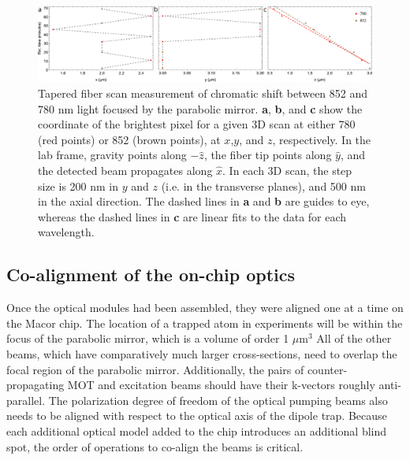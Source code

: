 \begin{figure}
    \centering
    \includegraphics[width=\textwidth]{Images/fiberscan_852_780_xyz_fig.pdf}
    \caption{Tapered fiber scan measurement of chromatic shift between 852 and 780 nm light focused by the parabolic mirror. \textbf{a}, \textbf{b}, and \textbf{c} show the coordinate of the brightest pixel for a given 3D scan at either 780 (red points) or 852 (brown points), at $x$,$y$, and $z$, respectively. In the lab frame, gravity points along $-\hat{z}$, the fiber tip points along $\hat{y}$, and the detected beam propagates along $\hat{x}$. In each 3D scan, the step size is 200 nm in $y$ and $z$ (i.e. in the transverse planes), and 500 nm in the axial direction. The dashed lines in \textbf{a} and \textbf{b} are guides to eye, whereas the dashed lines in \textbf{c} are linear fits to the data for each wavelength.}
    \label{fig:780_852_fiber_scan}
\end{figure}

\subsection{Co-alignment of the on-chip optics}

Once the optical modules had been assembled, they were aligned one at a time on the Macor chip. The location of a trapped atom in experiments will be within the focus of the parabolic mirror, which is a volume of order 1 $\mu \mathrm{m}$$^3$ All of the other beams, which have comparatively much larger cross-sections, need to overlap the focal region of the parabolic mirror. Additionally, the pairs of counter-propagating MOT and excitation beams should have their k-vectors roughly anti-parallel. The polarization degree of freedom of the optical pumping beams also needs to be aligned with respect to the optical axis of the dipole trap. Because each additional optical model added to the chip introduces an additional blind spot, the order of operations to co-align the beams is critical. 

